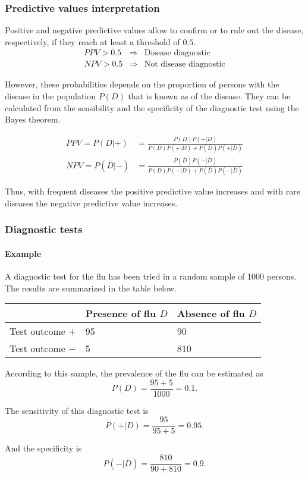 \begin{frame}
\frametitle{Predictive values interpretation}
Positive and negative predictive values allow to confirm or to rule out the disease, respectively, if they reach at
least a threshold of $0.5$.
\[
\begin{array}{rcl}
PPV>0.5 & \Rightarrow & \mbox{Disease diagnostic}\\
NPV>0.5 & \Rightarrow & \mbox{Not disease diagnostic} 
\end{array}
\]

However, these probabilities depends on the proportion of persons with the disease in the population $P(D)$ that is
known as  of the disease.
They can be calculated from the sensibility and the specificity of the diagnostic test using the Bayes theorem.

\begin{align*}
PPV=P(D|+) &= \frac{P(D)P(+|D)}{P(D)P(+|D)+P(\bar D)P(+|\bar D)}\\
NPV=P(\bar D|-) &= \frac{P(\bar D)P(-|\bar D)}{P(D)P(-|D)+P(\bar D)P(-|\bar D)}
\end{align*} 

Thus, with frequent diseases the positive predictive value increases and with rare diseases the negative predictive
value increases. 
\end{frame}


\begin{frame}
\frametitle{Diagnostic tests}
\framesubtitle{Example}
A diagnostic test for the flu has been tried in a random sample of 1000 persons.
The results are summarized in the table below.
\begin{center}
\begin{tabular}{|m{2.5cm}|m{3cm}<{\centering}|m{3cm}<{\centering}|}
\cline{2-3}
\multicolumn{1}{c|}{} & Presence of flu $D$ & Absence of flu $\bar D$\\ \hline
Test outcome $+$ & 95 & 90 \\
\hline
Test outcome $-$ & 5 & 810 \\
\hline
\end{tabular}
\end{center}

According to this sample, the prevalence of the flu can be estimated as
\[
P(D) = \frac{95+5}{1000} = 0.1.
\] 

The sensitivity of this diagnostic test is
\[
P(+|D) = \frac{95}{95+5}= 0.95. 
\] 

And the specificity is 
\[
P(-|\bar D) = \frac{810}{90+810}=0.9.
\]
\end{frame}


